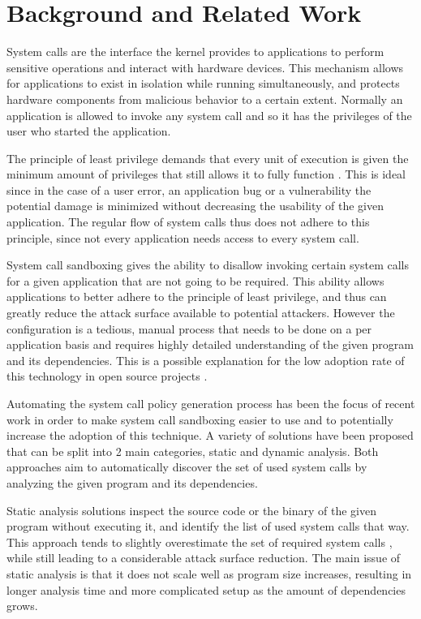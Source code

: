 \section{Background and Related Work}
System calls are the interface the kernel provides to applications to perform sensitive operations and interact with hardware devices. This mechanism allows for applications to exist in isolation while running simultaneously, and protects hardware components from malicious behavior to a certain extent. Normally an application is allowed to invoke any system call and so it has the privileges of the user who started the application.

The principle of least privilege demands that every unit of execution is given the minimum amount of privileges that still allows it to fully function \cite{ref_plp_1}. This is ideal since in the case of a user error, an application bug or a vulnerability the potential damage is minimized without decreasing the usability of the given application. The regular flow of system calls thus does not adhere to this principle, since not every application needs access to every system call.

System call sandboxing gives the ability to disallow invoking certain system calls for a given application that are not going to be required. This ability allows applications to better adhere to the principle of least privilege, and thus can greatly reduce the attack surface available to potential attackers. However the configuration is a tedious, manual process that needs to be done on a per application basis and requires highly detailed understanding of the given program and its dependencies. This is a possible explanation for the low adoption rate of this technology in open source projects \cite{ref_adoption_1}.

Automating the system call policy generation process has been the focus of recent work in order to make system call sandboxing easier to use and to potentially increase the adoption of this technique. A variety of solutions have been proposed that can be split into 2 main categories, static and dynamic analysis. Both approaches aim to automatically discover the set of used system calls by analyzing the given program and its dependencies.

Static analysis solutions \cite{ref_sp_1,ref_sp_3,ref_sp_2} inspect the source code or the binary of the given program without executing it, and identify the list of used system calls that way. This approach tends to slightly overestimate the set of required system calls \cite{ref_dyn_1}, while still leading to a considerable attack surface reduction. The main issue of static analysis is that it does not scale well as program size increases, resulting in longer analysis time and more complicated setup as the amount of dependencies grows.

